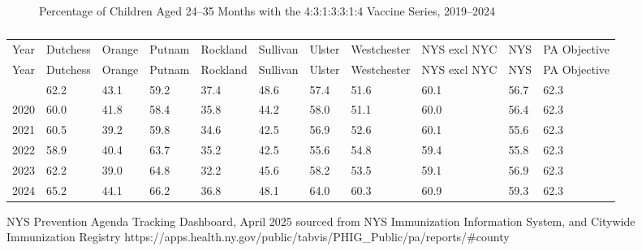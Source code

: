 \documentclass[
  english,
  letterpaper,
]{report}
\begin{document}
\begin{figure}


\caption{\label{fig-24to35mo-child-vaccine-series-percent}Percentage of
Children Aged 24--35 Months with the 4:3:1:3:3:1:4 Vaccine Series,
2019--2024}

\end{figure}%

\begin{longtable}[]{@{}lllllllllll@{}}

\caption{\label{tbl-24to35mo-child-vaccine-series-percent}Percentage of
Children Aged 24--35 Months with the 4:3:1:3:3:1:4 Vaccine Series,
2019--2024}

\tabularnewline

\caption{}\label{T_f1b73}\tabularnewline
\toprule\noalign{}
Year & Dutchess & Orange & Putnam & Rockland & Sullivan & Ulster &
Westchester & NYS excl NYC & NYS & PA Objective \\
\midrule\noalign{}
\endfirsthead
\toprule\noalign{}
Year & Dutchess & Orange & Putnam & Rockland & Sullivan & Ulster &
Westchester & NYS excl NYC & NYS & PA Objective \\
\midrule\noalign{}
\endhead
\bottomrule\noalign{}
\endlastfoot
2019 & 62.2 & 43.1 & 59.2 & 37.4 & 48.6 & 57.4 & 51.6 & 60.1 & 56.7 &
62.3 \\
2020 & 60.0 & 41.8 & 58.4 & 35.8 & 44.2 & 58.0 & 51.1 & 60.0 & 56.4 &
62.3 \\
2021 & 60.5 & 39.2 & 59.8 & 34.6 & 42.5 & 56.9 & 52.6 & 60.1 & 55.6 &
62.3 \\
2022 & 58.9 & 40.4 & 63.7 & 35.2 & 42.5 & 55.6 & 54.8 & 59.4 & 55.8 &
62.3 \\
2023 & 62.2 & 39.0 & 64.8 & 32.2 & 45.6 & 58.2 & 53.5 & 59.1 & 56.9 &
62.3 \\
2024 & 65.2 & 44.1 & 66.2 & 36.8 & 48.1 & 64.0 & 60.3 & 60.9 & 59.3 &
62.3 \\

\end{longtable}

\begin{tcolorbox}[enhanced jigsaw, breakable, leftrule=.75mm, title=\textcolor{quarto-callout-note-color}{\faInfo}\hspace{0.5em}{Source}, bottomrule=.15mm, opacityback=0, left=2mm, colback=white, bottomtitle=1mm, coltitle=black, colbacktitle=quarto-callout-note-color!10!white, colframe=quarto-callout-note-color-frame, opacitybacktitle=0.6, toptitle=1mm, titlerule=0mm, arc=.35mm, rightrule=.15mm, toprule=.15mm]

NYS Prevention Agenda Tracking Dashboard, April 2025 sourced from NYS
Immunization Information System, and Citywide Immunization Registry
https://apps.health.ny.gov/public/tabvis/PHIG\_Public/pa/reports/\#county

\end{tcolorbox}
\end{document}
